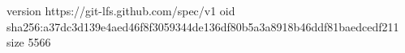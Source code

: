 version https://git-lfs.github.com/spec/v1
oid sha256:a37dc3d139e4aed46f8f3059344de136df80b5a3a8918b46ddf81baedcedf211
size 5566
